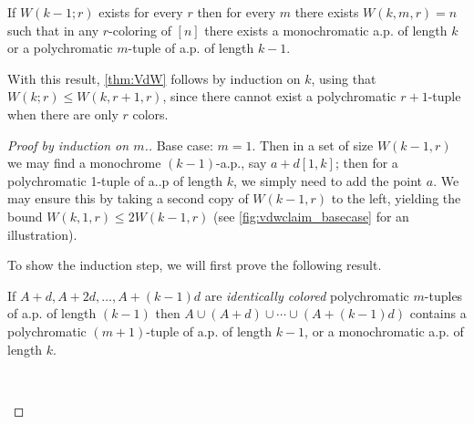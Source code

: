 \begin{lemma} \label{lem:Wkmr}
If $W(k-1;r)$ exists for every $r$ then for every $m$ there exists $W(k,m,r) = n$ such that in any $r$-coloring of $[n]$ there exists a monochromatic a.p. of length $k$ or a polychromatic $m$-tuple of a.p. of length $k-1$.
\end{lemma}
\begin{remark}
With this result,  \cref{thm:VdW} follows by induction on $k$, using that $W(k;r) \leq W(k,r+1,r)$, since there cannot exist a polychromatic $r+1$-tuple when there are only $r$ colors.
\end{remark}
\begin{proof}[Proof by induction on $m$.] Base case: $m=1$. Then in a set of size $W(k-1,r)$ we may find a monochrome $(k-1)$-a.p., say $a+d[1,k]$; then for a polychromatic 1-tuple of a..p of length $k$, we simply need to add the point $a$. We may ensure this by taking a second copy of $W(k-1,r)$ to the left, yielding the bound $ W(k,1,r) \leq 2W(k-1,r)$ (see \cref{fig:vdwclaim_basecase} for an illustration).
\begin{marginfigure}
\begin{center}
\end{center}
\caption{Depiction  showing $ W(k,1,r) \leq 2W(k-1,r)$ by finding a monochrome  $(k-1)$-a.p. $a  + d[1,k]$ in a set of size $W(k-1,r)$ and adding in the point $a$, which may be to the left of the original set of size $W(k-1,r)$.} \label{fig:vdwclaim_basecase}
\end{marginfigure}

To show the induction step, we will first prove the following result.
\begin{claim}
 If $A+d,A+2d,\dotsc, A+(k-1)d$ are \emph{identically colored} polychromatic $m$-tuples of a.p. of length $(k-1)$ then $A\cup (A+d)\cup\dotsm \cup (A+ (k-1)d)$ contains a polychromatic $(m+1)$-tuple of a.p. of length $k-1$, or a monochromatic a.p. of length $k$.
\end{claim}
\begin{subproof}
~\medskip


\end{subproof}
\end{proof}

